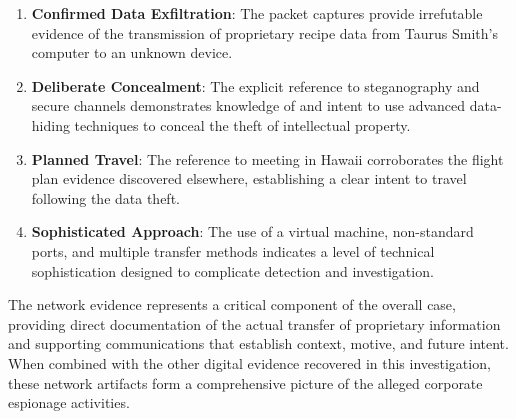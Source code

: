 \begin{enumerate}
    \item \textbf{Confirmed Data Exfiltration}: The packet captures provide irrefutable evidence of the transmission of proprietary recipe data from Taurus Smith's computer to an unknown device.
    
    \item \textbf{Deliberate Concealment}: The explicit reference to steganography and secure channels demonstrates knowledge of and intent to use advanced data-hiding techniques to conceal the theft of intellectual property.
    
    \item \textbf{Planned Travel}: The reference to meeting in Hawaii corroborates the flight plan evidence discovered elsewhere, establishing a clear intent to travel following the data theft.
    
    \item \textbf{Sophisticated Approach}: The use of a virtual machine, non-standard ports, and multiple transfer methods indicates a level of technical sophistication designed to complicate detection and investigation.
\end{enumerate}

The network evidence represents a critical component of the overall case, providing direct documentation of the actual transfer of proprietary information and supporting communications that establish context, motive, and future intent. When combined with the other digital evidence recovered in this investigation, these network artifacts form a comprehensive picture of the alleged corporate espionage activities.